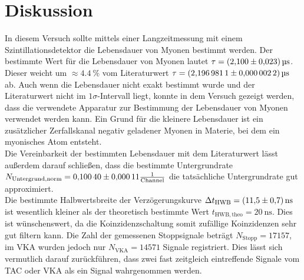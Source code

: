 \section{Diskussion}
In diesem Versuch sollte mittels einer Langzeitmessung mit einem Szintillationsdetektor die Lebensdauer von Myonen bestimmt werden. Der bestimmte Wert für die Lebensdauer von Myonen lautet $\tau = \SI{2.10 \pm 0.023}{\micro\second}$. Dieser weicht um $\approx \SI{4.4}{\percent}$ vom Literaturwert $\tau = \SI{2.1969811 \pm 0.0000022}{\micro\second}$\cite{ParticleDataGroup:2020ssz} ab. Auch wenn die Lebensdauer nicht exakt bestimmt wurde und der Literaturwert nicht im $1\sigma$-Intervall liegt, konnte in dem Versuch gezeigt werden, dass die verwendete Apparatur zur Bestimmung der Lebensdauer von Myonen verwendet werden kann. Ein Grund für die kleinere Lebensdauer ist ein zusätzlicher Zerfallskanal negativ geladener Myonen in Materie, bei dem ein myonisches Atom entsteht.\\
Die Vereinbarkeit der bestimmten Lebensdauer mit dem Literaturwert lässt außerdem darauf schließen, dass die bestimmte Untergrundrate $N_\mathrm{Untergrund,norm} = \num{0.1004 \pm 0.00011} \frac{1}{\mathrm{Channel}}$ die tatsächliche Untergrundrate gut approximiert.\\
Die bestimmte Halbwertsbreite der Verzögerungskurve $\Delta t_\mathrm{HWB} = \SI{11.5 \pm 0.7}{\nano\second}$ ist wesentlich kleiner als der theoretisch bestimmte Wert $t_\mathrm{HWB, theo} = \SI{20}{\nano\second}$. Dies ist wünschenswert, da die Koinzidenzschaltung somit zufällige Koinzidenzen sehr gut filtern kann.
Die Zahl der gemessenen Stoppsignale beträgt $N_\mathrm{Stopp} = \num{17157}$, im VKA wurden jedoch nur $N_\mathrm{VKA} = \num{14571}$ Signale registriert. Dies lässt sich vermutlich darauf zurückführen, dass zwei fast zeitgleich eintreffende Signale vom TAC oder VKA als ein Signal wahrgenommen werden.
